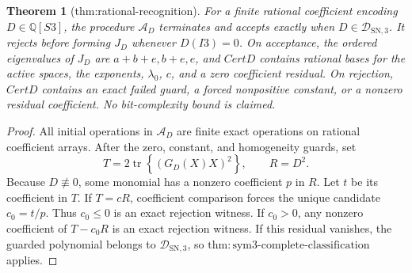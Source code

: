 \documentclass{article}
\newtheorem{theorem}{Theorem}
\begin{document}
\begin{theorem}[thm:rational-recognition]\label{thm:rational-recognition}
For a finite rational coefficient encoding \(D\in\mathbb Q[S3]\), the procedure \(\mathcal A_D\) terminates and accepts exactly when \(D\in\mathcal D_{\mathrm{SN},3}\). It rejects before forming \(J_D\) whenever \(D(I3)=0\). On acceptance, the ordered eigenvalues of \(J_D\) are \(a+b+e,b+e,e\), and \(CertD\) contains rational bases for the active spaces, the exponents, \(\lambda_0\), \(c\), and a zero coefficient residual. On rejection, \(CertD\) contains an exact failed guard, a forced nonpositive constant, or a nonzero residual coefficient. No bit-complexity bound is claimed.
\end{theorem}
\begin{proof}
All initial operations in \(\mathcal A_D\) are finite exact operations
on rational coefficient arrays.  After the zero, constant, and
homogeneity guards, set
\[
 T=2\operatorname{tr}\!\left\{(G_D(X)X)^2\right\},
 \qquad R=D^2.
\]
Because \(D\not\equiv0\), some monomial has a nonzero coefficient
\(p\) in \(R\).  Let \(t\) be its coefficient in \(T\).  If
\(T=cR\), coefficient comparison forces the unique candidate
\(c_0=t/p\).  Thus \(c_0\leq0\) is an exact rejection witness.  If
\(c_0>0\), any nonzero coefficient of \(T-c_0R\) is an exact rejection
witness.  If this residual vanishes, the guarded polynomial belongs to
\(\mathcal D_{\mathrm{SN},3}\), so
\(\mathrm{thm{:}sym3\text{-}complete\text{-}classification}\) applies.


\end{proof}
\end{document}
